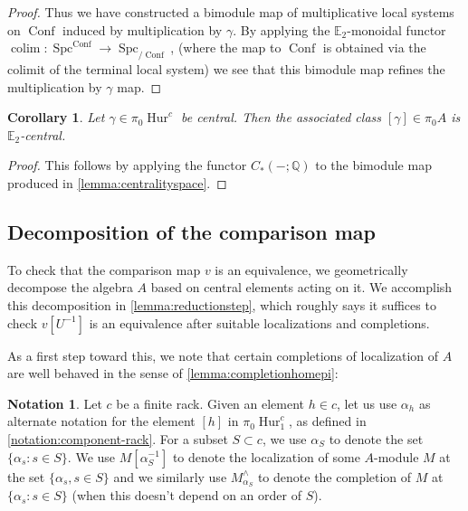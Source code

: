 \documentclass[12 pt]{amsart}
\theoremstyle{plain}
\newtheorem{corollary}[theorem]{Corollary}
\theoremstyle{definition}
\newtheorem{notation}[theorem]{Notation}
\theoremstyle{remark}
\numberwithin{equation}{section}
\DeclareMathOperator\Spc{Spc}
\DeclareMathOperator\Hur{Hur}
\DeclareMathOperator\Conf{Conf}
\newcommand\QQ{\mathbb{Q}}
\newcommand\EE{\mathbb{E}}
\DeclareMathOperator\colim{colim}
\begin{document}
\begin{proof}
	Thus we have constructed a bimodule map of multiplicative local systems
	on $\Conf$ induced by multiplication by $\gamma$. By applying the $\EE_2$-monoidal functor $\colim:\Spc^{\Conf} \to \Spc_{/\Conf}$, (where the map to $\Conf$ is obtained via the colimit of the terminal local system) %
	we see that this bimodule map refines the multiplication by $\gamma$ map.
\end{proof}

\begin{corollary}
	\label{lemma:centrality}
		Let $\gamma\in \pi_0\Hur^{c}$ 
		be central. Then the associated class $[\gamma] \in \pi_0A$ is $\EE_2$-central.
\end{corollary}

\begin{proof}
	 This follows by applying the functor $C_*(-;\QQ)$ to the bimodule map produced in \autoref{lemma:centralityspace}.
\end{proof} 


\subsection{Decomposition of the comparison map}
\label{subsection:comparison-map}

To check that the comparison map $v$ is an equivalence, we geometrically decompose the algebra $A$ based on central elements acting on it.
We accomplish this decomposition in \autoref{lemma:reductionstep}, which roughly
says it suffices to check $v[U^{-1}]$ is an equivalence after suitable 
localizations and completions.

As a first step toward this, we note that certain completions of localization of $A$ are well behaved in the sense of \autoref{lemma:completionhomepi}:

\begin{notation}
	\label{notation:rack}
	Let $c$ be a finite rack.
	Given an element $h \in c$, let us use $\alpha_h$ as alternate notation
	for the	element $[h]$ in $\pi_0\Hur_1^{c}$, as defined in
\autoref{notation:component-rack}. 
	For a subset $S \subset c$, we use $\alpha_S$ to denote the set
	$\{\alpha_s:s\in S\}$.
	We use $M[\alpha_S^{-1}]$ to denote the localization of some $A$-module $M$ at the
	set $\{\alpha_s,s\in S\}$ and we similarly use
	$M^\wedge_{\alpha_S}$ to denote the completion of $M$ at $\{\alpha_s : s \in
	S\}$ (when this doesn't depend on an order of $S$).
\end{notation}
\end{document}
